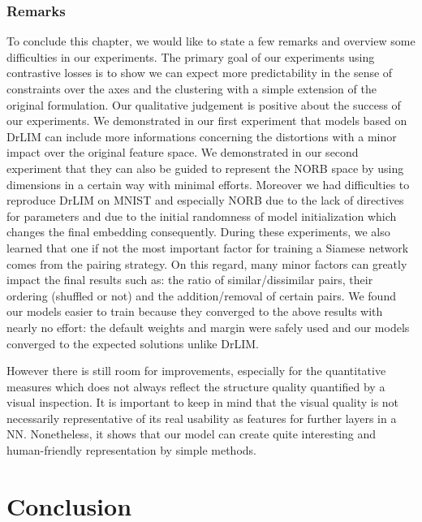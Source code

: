 \documentclass[a4paper,12pt]{report}
\begin{document}
\subsection{Remarks}
To conclude this chapter, we would like to state a few remarks and overview some difficulties in our experiments.
The primary goal of our experiments using contrastive losses is to show we can expect more predictability in the sense of constraints over the axes and the clustering with a simple extension of the original formulation.
Our qualitative judgement is positive about the success of our experiments.
We demonstrated in our first experiment that models based on DrLIM can include more informations concerning the distortions with a minor impact over the original feature space.
We demonstrated in our second experiment that they can also be guided to represent the NORB space by using dimensions in a certain way with minimal efforts.
Moreover we had difficulties to reproduce DrLIM on MNIST and especially NORB due to the lack of directives for parameters and due to the initial randomness of model initialization which changes the final embedding consequently.
During these experiments, we also learned that one if not the most important factor for training a Siamese network comes from the pairing strategy.
On this regard, many minor factors can greatly impact the final results such as: the ratio of similar/dissimilar pairs, their ordering (shuffled or not) and the addition/removal of certain pairs.
We found our models easier to train because they converged to the above results with nearly no effort: the default weights and margin were safely used and our models converged to the expected solutions unlike DrLIM.

However there is still room for improvements, especially for the quantitative measures which does not always reflect the structure quality quantified by a visual inspection.
It is important to keep in mind that the visual quality is not necessarily representative of its real usability as features for further layers in a NN.
Nonetheless, it shows that our model can create quite interesting and human-friendly representation by simple methods.


\chapter{Conclusion}
\label{chap:conclusion}
\end{document}

